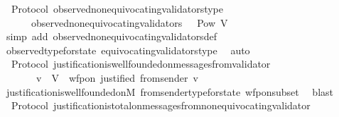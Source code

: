 \begin{isabellebody}
\ {\isacharparenleft}\ Protocol{\isacharparenright}\ observed{\isacharunderscore}non{\isacharunderscore}equivocating{\isacharunderscore}validators{\isacharunderscore}type\ {\isacharcolon}\isanewline
\ \ {\isachardoublequoteopen}{\isasymforall}\ {\isasymsigma}\ {\isasymin}\ {\isasymSigma}{\isachardot}\ observed{\isacharunderscore}non{\isacharunderscore}equivocating{\isacharunderscore}validators\ {\isasymsigma}\ {\isasymin}\ Pow\ V{\isachardoublequoteclose}\isanewline
%
\isadelimproof
\ \ %
\endisadelimproof
%
\isatagproof
{}\isamarkupfalse%
\ {\isacharparenleft}simp\ add{\isacharcolon}\ observed{\isacharunderscore}non{\isacharunderscore}equivocating{\isacharunderscore}validators{\isacharunderscore}def{\isacharparenright}\isanewline
\ \ \isamarkupfalse%
\ observed{\isacharunderscore}type{\isacharunderscore}for{\isacharunderscore}state\ equivocating{\isacharunderscore}validators{\isacharunderscore}type\ \isamarkupfalse%
\ auto%
\endisatagproof
{\isafoldproof}%
%
\isadelimproof
\isanewline
%
\endisadelimproof
\isanewline
{}\isamarkupfalse%
\ {\isacharparenleft}\ Protocol{\isacharparenright}\ justification{\isacharunderscore}is{\isacharunderscore}well{\isacharunderscore}founded{\isacharunderscore}on{\isacharunderscore}messages{\isacharunderscore}from{\isacharunderscore}validator{\isacharcolon}\isanewline
\ \ {\isachardoublequoteopen}{\isasymforall}\ {\isasymsigma}\ {\isasymin}\ {\isasymSigma}{\isachardot}\ {\isacharparenleft}{\isasymforall}\ v\ {\isasymin}\ V{\isachardot}\ \ wfp{\isacharunderscore}on\ justified\ {\isacharparenleft}from{\isacharunderscore}sender\ {\isacharparenleft}v{\isacharcomma}\ {\isasymsigma}{\isacharparenright}{\isacharparenright}{\isacharparenright}{\isachardoublequoteclose}\isanewline
%
\isadelimproof
\ \ %
\endisadelimproof
%
\isatagproof
{}\isamarkupfalse%
\ justification{\isacharunderscore}is{\isacharunderscore}well{\isacharunderscore}founded{\isacharunderscore}on{\isacharunderscore}M\ from{\isacharunderscore}sender{\isacharunderscore}type{\isacharunderscore}for{\isacharunderscore}state\ wfp{\isacharunderscore}on{\isacharunderscore}subset\ \isamarkupfalse%
\ blast%
\endisatagproof
{\isafoldproof}%
%
\isadelimproof
\ \isanewline
%
\endisadelimproof
\isanewline
{}\isamarkupfalse%
\ {\isacharparenleft}\ Protocol{\isacharparenright}\ justification{\isacharunderscore}is{\isacharunderscore}total{\isacharunderscore}on{\isacharunderscore}messages{\isacharunderscore}from{\isacharunderscore}non{\isacharunderscore}equivocating{\isacharunderscore}validator{\isacharcolon}\isanewline

\end{isabellebody}
